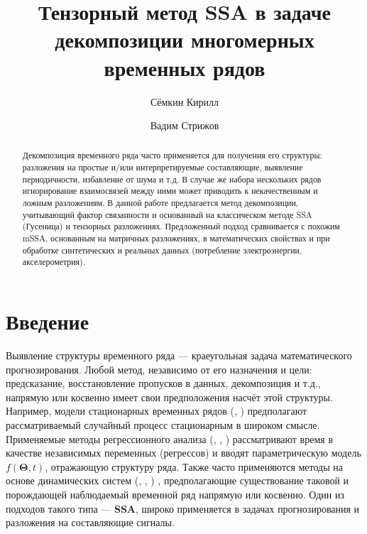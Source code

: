 
\usepackage[backend=biber]{biblatex}



\title{Тензорный метод SSA в задаче декомпозиции многомерных временных рядов}
\author{Сёмкин Кирилл \and Вадим Стрижов}
\date{}



	
	\maketitle
	
	\begin{abstract}
		
		Декомпозиция временного ряда часто применяется для получения его структуры: разложения на простые и/или интерпретируемые составляющие, выявление периодичности, избавление от шума и т.д. В случае же набора нескольких рядов игнорирование взаимосвязей между ними может приводить к некачественным и ложным разложениям. В данной работе предлагается метод декомпозиции, учитывающий фактор связанности и основанный на классическом методе SSA (Гусеница) и тензорных разложениях. Предложенный подход сравнивается с похожим mSSA, основанным на матричных разложениях, в математических свойствах и при обработке синтетических и реальных данных (потребление электроэнергии, акселерометрия).
		
	\end{abstract}
	
	\section*{Введение}\label{Intro}
	
		Выявление структуры временного ряда --- краеугольная задача математического прогнозирования. Любой метод, независимо от его назначения и цели: предсказание, восстановление пропусков в данных, декомпозиция и т.д., напрямую или косвенно имеет свои предположения насчёт этой структуры. Например, модели стационарных временных рядов (\cite{Box_Jenkins_methodology}, \cite{hamilton1994time}) предполагают рассматриваемый случайный процесс стационарным в широком смысле. Применяемые методы регрессионного анализа (\cite{3b1355aedd1041f1853e609a410576f3}, \cite{Greene2003Econometric}, \cite{enders2010applied})  рассматривают время в качестве независимых переменных (регрессов) и вводят параметрическую модель $ f(\mathbf{\Theta}, t) $, отражающую структуру ряда. Также часто применяются методы на основе динамических систем (\cite{ecfb9dc578be43ae9ee8fc88b8ff9151}, \cite{chen2018neural}, \cite{Tsonis2018}) , предполагающие существование таковой и порождающей наблюдаемый временной ряд напрямую или косвенно. Один из подходов такого типа --- \textbf{SSA}, широко применяется в задачах прогнозирования и разложения на составляющие сигналы.
		
